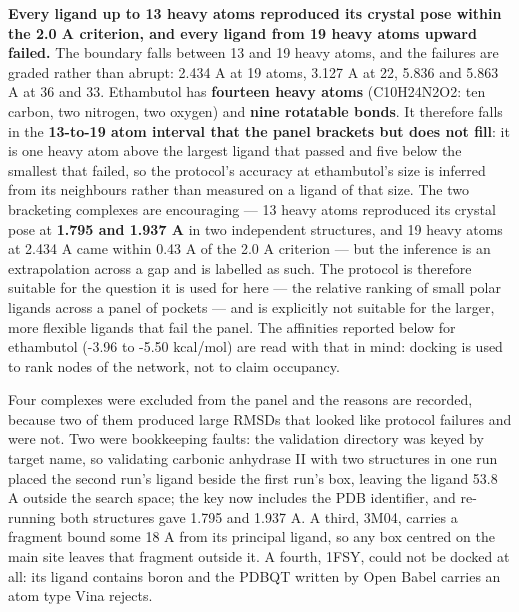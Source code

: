 \documentclass[utf8]{FrontiersinVancouver}
\begin{document}
\textbf{Every ligand up to 13 heavy atoms reproduced its crystal pose within the 2.0 A criterion, and every ligand from 19 heavy atoms upward failed.} The boundary falls between 13 and 19 heavy atoms, and the failures are graded rather than abrupt: 2.434 A at 19 atoms, 3.127 A at 22, 5.836 and 5.863 A at 36 and 33. Ethambutol has \textbf{fourteen heavy atoms} (C10H24N2O2: ten carbon, two nitrogen, two oxygen) and \textbf{nine rotatable bonds}. It therefore falls in the \textbf{13-to-19 atom interval that the panel brackets but does not fill}: it is one heavy atom above the largest ligand that passed and five below the smallest that failed, so the protocol's accuracy at ethambutol's size is inferred from its neighbours rather than measured on a ligand of that size. The two bracketing complexes are encouraging --- 13 heavy atoms reproduced its crystal pose at \textbf{1.795 and 1.937 A} in two independent structures, and 19 heavy atoms at 2.434 A came within 0.43 A of the 2.0 A criterion --- but the inference is an extrapolation across a gap and is labelled as such. The protocol is therefore suitable for the question it is used for here --- the relative ranking of small polar ligands across a panel of pockets --- and is explicitly not suitable for the larger, more flexible ligands that fail the panel. The affinities reported below for ethambutol (-3.96 to -5.50 kcal/mol) are read with that in mind: docking is used to rank nodes of the network, not to claim occupancy.

Four complexes were excluded from the panel and the reasons are recorded, because two of them produced large RMSDs that looked like protocol failures and were not. Two were bookkeeping faults: the validation directory was keyed by target name, so validating carbonic anhydrase II with two structures in one run placed the second run's ligand beside the first run's box, leaving the ligand 53.8 A outside the search space; the key now includes the PDB identifier, and re-running both structures gave 1.795 and 1.937 A. A third, 3M04, carries a fragment bound some 18 A from its principal ligand, so any box centred on the main site leaves that fragment outside it. A fourth, 1FSY, could not be docked at all: its ligand contains boron and the PDBQT written by Open Babel carries an atom type Vina rejects.
\end{document}
